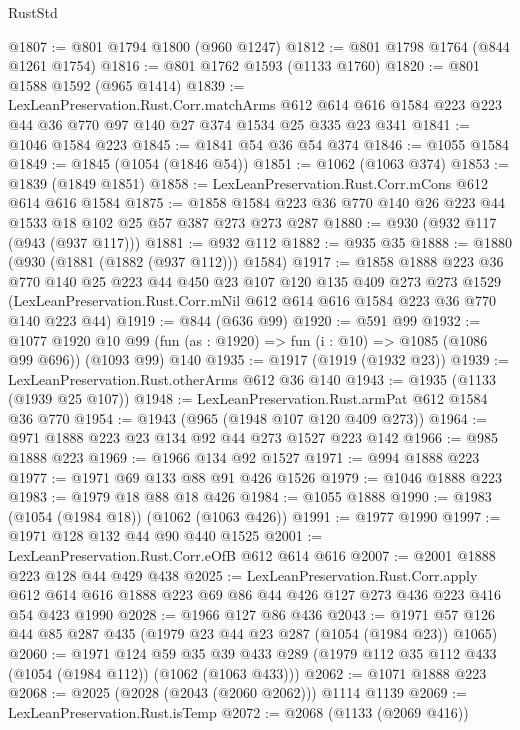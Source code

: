 \begin{lexlean}{RustStd}
\begin{coremodule}
{\begin{coremodule}
{{{{{{{{@1807 := @801 @1794 @1800 (@960 @1247)
@1812 := @801 @1798 @1764 (@844 @1261 @1754)
@1816 := @801 @1762 @1593 (@1133 @1760)
@1820 := @801 @1588 @1592 (@965 @1414)
@1839 := LexLeanPreservation.Rust.Corr.matchArms
    @612
    @614
    @616
    @1584
    @223
    @223
    @44
    @36
    @770
    @97
    @140
    @27
    @374
    @1534
    @25
    @335
    @23
    @341
@1841 := @1046 @1584 @223
@1845 := @1841 @54 @36 @54 @374
@1846 := @1055 @1584
@1849 := @1845 (@1054 (@1846 @54))
@1851 := @1062 (@1063 @374)
@1853 := @1839 (@1849 @1851)
@1858 := LexLeanPreservation.Rust.Corr.mCons @612 @614 @616 @1584
@1875 := @1858 @1584 @223 @36 @770 @140 @26 @223 @44 @1533 @18 @102 @25 @57 @387 @273 @273 @287
@1880 := @930 (@932 @117 (@943 (@937 @117)))
@1881 := @932 @112
@1882 := @935 @35
@1888 := @1880 (@930 (@1881 (@1882 (@937 @112))) @1584)
@1917 := @1858
    @1888
    @223
    @36
    @770
    @140
    @25
    @223
    @44
    @450
    @23
    @107
    @120
    @135
    @409
    @273
    @273
    @1529
    (LexLeanPreservation.Rust.Corr.mNil @612 @614 @616 @1584 @223 @36 @770 @140 @223 @44)
@1919 := @844 (@636 @99)
@1920 := @591 @99
@1932 := @1077
    @1920
    @10
    @99
    (fun (as : @1920) => fun (i : @10) => @1085 (@1086 @99 @696))
    (@1093 @99)
    @140
@1935 := @1917 (@1919 (@1932 @23))
@1939 := LexLeanPreservation.Rust.otherArms @612 @36 @140
@1943 := @1935 (@1133 (@1939 @25 @107))
@1948 := LexLeanPreservation.Rust.armPat @612 @1584 @36 @770
@1954 := @1943 (@965 (@1948 @107 @120 @409 @273))
@1964 := @971 @1888 @223 @23 @134 @92 @44 @273 @1527 @223 @142
@1966 := @985 @1888 @223
@1969 := @1966 @134 @92 @1527
@1971 := @994 @1888 @223
@1977 := @1971 @69 @133 @88 @91 @426 @1526
@1979 := @1046 @1888 @223
@1983 := @1979 @18 @88 @18 @426
@1984 := @1055 @1888
@1990 := @1983 (@1054 (@1984 @18)) (@1062 (@1063 @426))
@1991 := @1977 @1990
@1997 := @1971 @128 @132 @44 @90 @440 @1525
@2001 := LexLeanPreservation.Rust.Corr.eOfB @612 @614 @616
@2007 := @2001 @1888 @223 @128 @44 @429 @438
@2025 := LexLeanPreservation.Rust.Corr.apply
    @612
    @614
    @616
    @1888
    @223
    @69
    @86
    @44
    @426
    @127
    @273
    @436
    @223
    @416
    @54
    @423
    @1990
@2028 := @1966 @127 @86 @436
@2043 := @1971 @57 @126 @44 @85 @287 @435 (@1979 @23 @44 @23 @287 (@1054 (@1984 @23)) @1065)
@2060 := @1971
    @124
    @59
    @35
    @39
    @433
    @289
    (@1979 @112 @35 @112 @433 (@1054 (@1984 @112)) (@1062 (@1063 @433)))
@2062 := @1071 @1888 @223
@2068 := @2025 (@2028 (@2043 (@2060 @2062))) @1114 @1139
@2069 := LexLeanPreservation.Rust.isTemp
@2072 := @2068 (@1133 (@2069 @416))
}}}}}}}}
\end{coremodule}}
\end{coremodule}
\end{lexlean}
